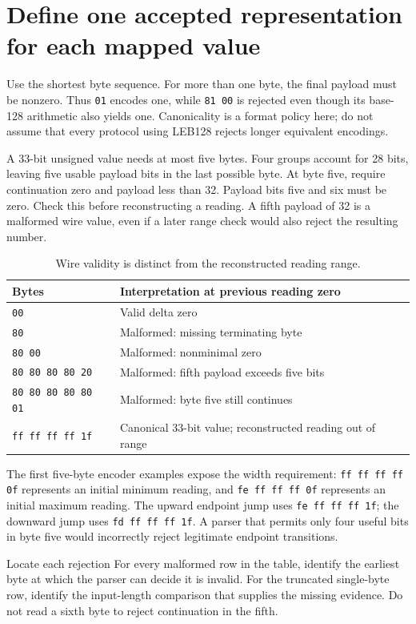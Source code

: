 \section{Define one accepted representation for each mapped value}
Use the shortest byte sequence. For more than one byte, the final payload must be
nonzero. Thus \texttt{01} encodes one, while \texttt{81 00} is rejected even though
its base-128 arithmetic also yields one. Canonicality is a format policy here; do not
assume that every protocol using LEB128 rejects longer equivalent encodings.

A 33-bit unsigned value needs at most five bytes. Four groups account for 28 bits,
leaving five usable payload bits in the last possible byte. At byte five, require
continuation zero and payload less than 32. Payload bits five and six must be zero.
Check this before reconstructing a reading. A fifth payload of 32 is a malformed
wire value, even if a later range check would also reject the resulting number.

\begin{table}[htbp]
  \centering
  \caption{Wire validity is distinct from the reconstructed reading range.}
  \begin{tabular}{ll}
    \toprule
    Bytes                      & Interpretation at previous reading zero                    \\
    \midrule
    \texttt{00}                & Valid delta zero                                           \\
    \texttt{80}                & Malformed: missing terminating byte                        \\
    \texttt{80 00}             & Malformed: nonminimal zero                                 \\
    \texttt{80 80 80 80 20}    & Malformed: fifth payload exceeds five bits                 \\
    \texttt{80 80 80 80 80 01} & Malformed: byte five still continues                       \\
    \texttt{ff ff ff ff 1f}    & Canonical 33-bit value; reconstructed reading out of range \\
    \bottomrule
  \end{tabular}
\end{table}

The first five-byte encoder examples expose the width requirement:
\texttt{ff ff ff ff 0f} represents an initial minimum reading, and
\texttt{fe ff ff ff 0f} represents an initial maximum reading.
The upward endpoint jump uses \texttt{fe ff ff ff 1f}; the downward jump uses
\texttt{fd ff ff ff 1f}. A parser that permits only four useful bits in byte five
would incorrectly reject legitimate endpoint transitions.

\begin{MARSExercise}{Locate each rejection}
  For every malformed row in the table, identify the earliest byte at which the parser
  can decide it is invalid. For the truncated single-byte row, identify the input-length
  comparison that supplies the missing evidence. Do not read a sixth byte to reject
  continuation in the fifth.
\end{MARSExercise}
